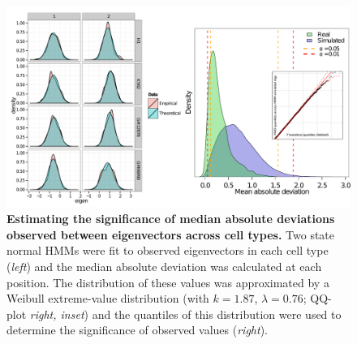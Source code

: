 \documentclass[a4paper]{report}
\begin{document}
\begin{figure}[H]
\begin{center}
\includegraphics[width=\textwidth]{figs/s13_all.pdf}
\captionsetup{width=\textwidth}
\caption{ {\bf Estimating the significance of median absolute deviations
  observed between eigenvectors across cell types.} Two state normal
HMMs were fit to observed eigenvectors in each cell type (\emph{left})
and the median absolute deviation was calculated at each position. The
distribution of these values was approximated by a Weibull
extreme-value distribution (with $k = 1.87$, $\lambda = 0.76$; QQ-plot
\emph{right, inset}) and the quantiles of this distribution were used
to determine the significance of observed values (\emph{right}).
}\label{fig:varsignif}
\end{center} 
\end{figure} 



%

\begin{footnotesize}

\end{footnotesize}
\end{document}
